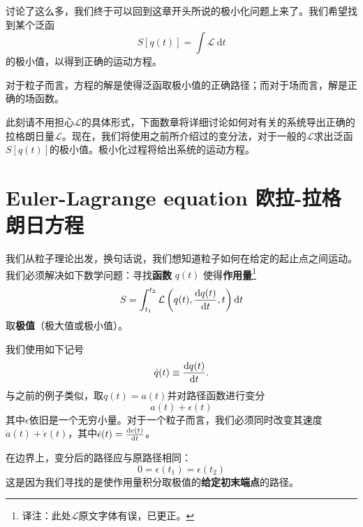讨论了这么多，我们终于可以回到这章开头所说的极小化问题上来了。我们希望找到某个泛函
\[
S[q(t)] = \int {\mathcal L}~{\mathrm d}t
\]
的极小值，以得到正确的运动方程。

对于粒子而言，方程的解是使得泛函取极小值的正确路径；而对于场而言，解是正确的场函数。

此刻请不用担心\(\mathcal L\)的具体形式，下面数章将详细讨论如何对有关的系统导出正确的拉格朗日量\({\mathcal L}\)。现在，我们将使用之前所介绍过的变分法，对于一般的\(\mathcal L\)求出泛函\(S[q(t)]\)的极小值。极小化过程将给出系统的运动方程。

\section[欧拉-拉格朗日方程]{Euler-Lagrange equation \quad 欧拉-拉格朗日方程}\label{sec4.4}
我们从粒子理论出发，换句话说，我们想知道粒子如何在给定的起止点之间运动。我们必须解决如下数学问题：寻找{\bfseries 函数} \(q(t)\) 使得{\bfseries 作用量}\footnote{译注：此处${\mathcal L}$原文字体有误，已更正。}
\[
S = \int_{t_1}^{t_2} {\mathcal L}\left(q(t),\frac{\mathrm d q(t)}{\mathrm d t},t\right) \mathrm d t
\]
取{\bfseries 极值}（极大值或极小值）。

我们使用如下记号
\[
\dot q(t) \equiv \frac{\mathrm d q(t)}{\mathrm d t}.
\]
与之前的例子类似，取\(q(t)=a(t)\)并对路径函数进行变分
\[
a(t) + \epsilon(t)
\]
其中\(\epsilon\)依旧是一个无穷小量。对于一个粒子而言，我们必须同时改变其速度\(\dot a(t) + \dot\epsilon(t)\)，其中\(\dot\epsilon(t) = \frac{\mathrm d \epsilon(t)}{\mathrm d t}\)。

在边界上，变分后的路径应与原路径相同：
\begin{equation}
0 = \epsilon(t_1) = \epsilon(t_2)
\label{equ4.5}
\end{equation}
这是因为我们寻找的是使作用量积分取极值的{\bfseries 给定初末端点}的路径。

